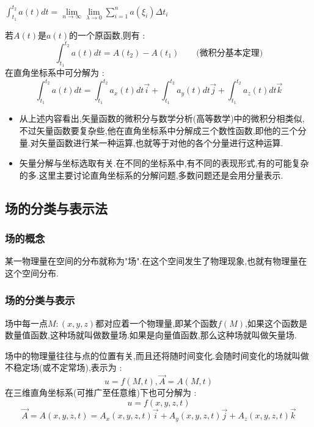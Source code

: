 \documentclass[UTF8,12pt]{ctexbook}
\newcommand{\limNormal}[1]{\lim\limits_{#1}}
\newcommand{\upDownSum}[2]{\sum\limits_{#2}^{#1}}
\newcommand{\defFunction}[1]{f(#1)}
\newcommand{\definiteIntegral}[2]{\int^{#1}_{#2}}
\newcommand{\spaceline}{\\\indent}
\begin{document}
{{{{      $\definiteIntegral{t_2}{t_1}a(t)dt = \limNormal{n \to \infty}\limNormal{\lambda \to 0}\upDownSum{n}{i = 1}a(\xi_i)\Delta t_i$

      若$A(t)$是$a(t)$的一个原函数,则有 :
      $$
        \definiteIntegral{t_2}{t_1}a(t)dt = A(t_2) - A(t_1)\qquad \mbox{(微积分基本定理)}
      $$
      在直角坐标系中可分解为 :
      $$
        \definiteIntegral{t_2}{t_1}a(t)dt = \definiteIntegral{t_2}{t_1}a_x(t)dt\vec{i} + \definiteIntegral{t_2}{t_1}a_y(t)dt\vec{j} + \definiteIntegral{t_2}{t_1}a_z(t)dt\vec{k}
      $$
    }%

    \begin{itemize}
      \item 从上述内容看出,矢量函数的微积分与数学分析(高等数学)中的微积分相类似,不过矢量函数要复杂些,他在直角坐标系中分解成三个数性函数,即他的三个分量.对矢量函数进行某一种运算,也就等于对他的各个分量进行这种运算.
      \item 矢量分解与坐标选取有关.在不同的坐标系中,有不同的表现形式,有的可能复杂的多.这里主要讨论直角坐标系的分解问题,多数问题还是会用分量表示.
    \end{itemize}

  }%

  \subsection{场的分类与表示法}{

    \subsubsection{场的概念}{
      某一物理量在空间的分布就称为"场".在这个空间发生了物理现象,也就有物理量在这个空间分布.
    }%

    \subsubsection{场的分类与表示}{
      场中每一点$M:(x,y,z)$都对应着一个物理量,即某个函数$\defFunction{M}$,如果这个函数是数量值函数,这种场就叫做数量场.如果是向量值函数,那么这种场就叫做矢量场.

      场中的物理量往往与点的位置有关,而且还将随时间变化.会随时间变化的场就叫做不稳定场(或不定常场),表示为 :
      $$
        u= \defFunction{M,t},\vec{A} = A(M,t)
      $$
      在三维直角坐标系(可推广至任意维)下也可分解为 :
      $$
        u = \defFunction{x,y,z,t}
      $$
      $$
        \vec{A} = A(x,y,z,t) = A_x(x,y,z,t)\vec{i} + A_y(x,y,z,t)\vec{j} + A_z(x,y,z,t)\vec{k}
      $$\spaceline

}}}}
\end{document}
